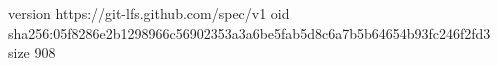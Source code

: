 version https://git-lfs.github.com/spec/v1
oid sha256:05f8286e2b1298966c56902353a3a6be5fab5d8c6a7b5b64654b93fc246f2fd3
size 908
